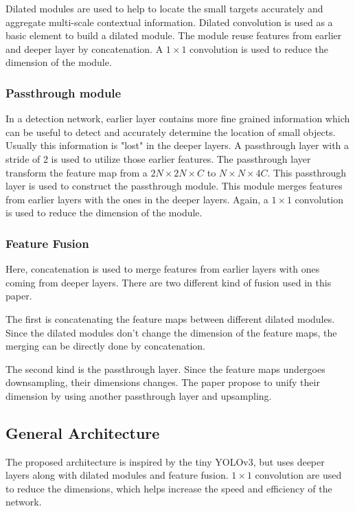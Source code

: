Dilated modules are used to help to locate the small targets accurately and aggregate multi-scale contextual information. Dilated convolution is used as a basic element to build a dilated module. The module reuse features from earlier and deeper layer by concatenation. A $1 \times 1$ convolution is used to reduce the dimension of the module. 
\subsubsection{Passthrough module}

In a detection network, earlier layer contains more fine grained information which can be useful to detect and accurately determine the location of small objects. Usually this information is "lost" in the deeper layers. A passthrough layer with a stride of 2 is used to utilize those earlier features. The passthrough layer transform the feature map from a $2N \times 2N \times C$ to $N \times N \times 4C$. This passthrough layer is used to construct the passthrough module. This module merges features from earlier layers with the ones in the deeper layers. Again, a $1 \times 1$ convolution is used to reduce the dimension of the module.

\subsubsection{Feature Fusion}
Here, concatenation is used to merge features from earlier layers with ones coming from deeper layers. There are two different kind of fusion used in this paper. 

The first is concatenating the feature maps between different dilated modules. Since the dilated modules don't change the dimension of the feature maps, the merging can be directly done by concatenation.

The second kind is the passthrough layer. Since the feature maps undergoes downsampling, their dimensions changes. The paper propose to unify their dimension by using another passthrough layer and upsampling. 

\subsection{General Architecture} 
The proposed architecture is inspired by the tiny YOLOv3, but uses deeper layers along with dilated modules and feature fusion. $1 \times 1$ convolution are used to reduce the dimensions, which helps increase the speed and efficiency of the network.

